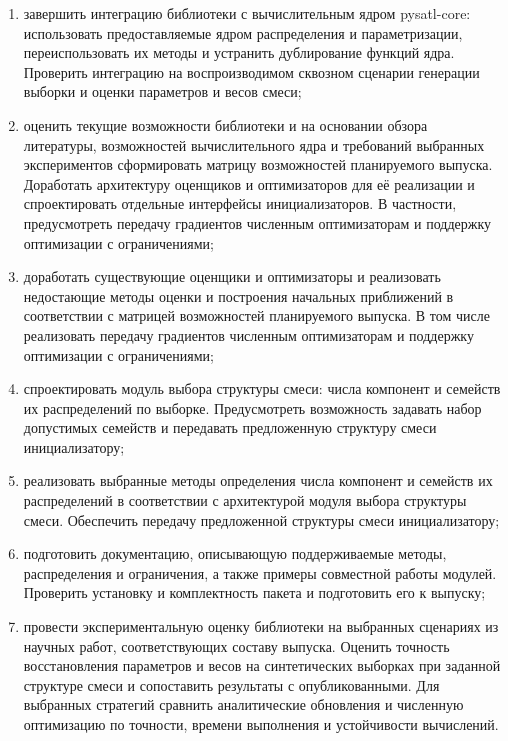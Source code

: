 \begin{enumerate}
    \item\label{task:core}
          завершить интеграцию библиотеки с вычислительным ядром pysatl-core: использовать предоставляемые ядром распределения и параметризации, переиспользовать их методы и устранить дублирование функций ядра. Проверить интеграцию на воспроизводимом сквозном сценарии генерации выборки и оценки параметров и весов смеси;
    \item\label{task:architecture} оценить текущие возможности библиотеки и на основании обзора литературы, возможностей вычислительного ядра и требований выбранных экспериментов сформировать матрицу возможностей планируемого выпуска. Доработать архитектуру оценщиков и оптимизаторов для её реализации и спроектировать отдельные интерфейсы инициализаторов. В частности, предусмотреть передачу градиентов численным оптимизаторам и поддержку оптимизации с ограничениями;
    \item\label{task:estimators} доработать существующие оценщики и оптимизаторы и реализовать недостающие методы оценки и построения начальных приближений в соответствии с матрицей возможностей планируемого выпуска. В том числе реализовать передачу градиентов численным оптимизаторам и поддержку оптимизации с ограничениями;
    \item\label{task:preprocessing-design} спроектировать модуль выбора структуры смеси: числа компонент и семейств их распределений по выборке. Предусмотреть возможность задавать набор допустимых семейств и передавать предложенную структуру смеси инициализатору;
    \item\label{task:preprocessing} реализовать выбранные методы определения числа компонент и семейств их распределений в соответствии с архитектурой модуля выбора структуры смеси. Обеспечить передачу предложенной структуры смеси инициализатору;
    \item\label{task:release} подготовить документацию, описывающую поддерживаемые методы, распределения и ограничения, а также примеры совместной работы модулей. Проверить установку и комплектность пакета и подготовить его к выпуску;
    \item\label{task:experiments} провести экспериментальную оценку библиотеки на выбранных сценариях из научных работ, соответствующих составу выпуска. Оценить точность восстановления параметров и весов на синтетических выборках при заданной структуре смеси и сопоставить результаты с опубликованными. Для выбранных стратегий сравнить аналитические обновления и численную оптимизацию по точности, времени выполнения и устойчивости вычислений.
\end{enumerate}
